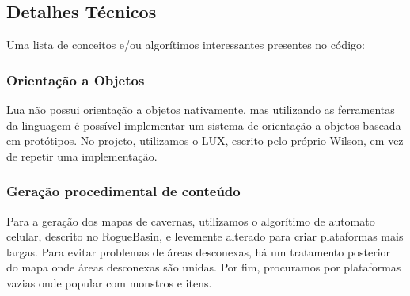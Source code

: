   \subsection{Detalhes Técnicos}
    Uma lista de conceitos e/ou algorítimos interessantes presentes no código:
    
    \subsubsection{Orientação a Objetos}
      Lua não possui orientação a objetos nativamente, mas utilizando as ferramentas da linguagem é possível
      implementar um sistema de orientação a objetos baseada em protótipos.
      No projeto, utilizamos o LUX\footnotemark{}, escrito pelo próprio Wilson, em vez de repetir uma implementação.
      
    
    \subsubsection{Geração procedimental de conteúdo}
      Para a geração dos mapas de cavernas, utilizamos o algorítimo de automato celular, descrito no RogueBasin,
      \cite{roguebasin:cellularautomata} e levemente alterado para criar plataformas mais largas. Para
      evitar problemas de áreas desconexas, há um tratamento posterior do mapa onde áreas desconexas são unidas.
      Por fim, procuramos por plataformas vazias onde popular com monstros e itens.